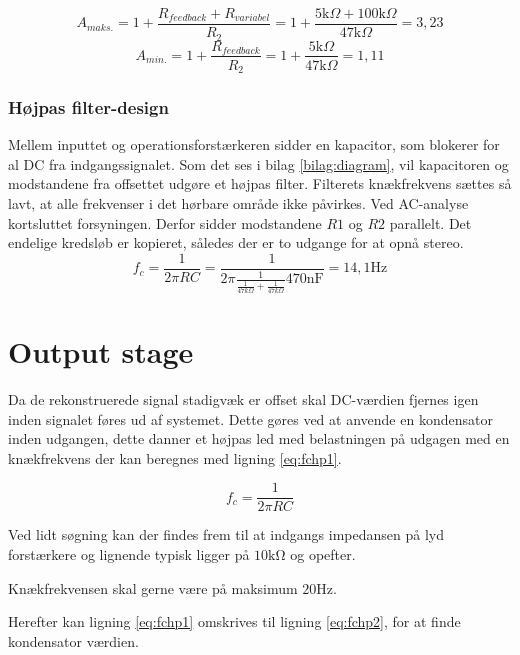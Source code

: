 \begin{equation}
\label{eq:Aminfors}
A_{maks.} = 1 + \frac{R_{feedback} + R_{variabel}}{R_2} = 1 + \frac{5\text{k} \Omega + 100\text{k} \Omega}{47\text{k} \Omega} = 3,23
\end{equation}
\begin{equation}
\label{Amaksfors}
A_{min.} = 1 + \frac{R_{feedback}}{R_2} = 1 + \frac{5\text{k} \Omega}{47\text{k} \Omega} = 1,11
\end{equation}

\subsubsection{Højpas filter-design}
Mellem inputtet og operationsforstærkeren sidder en kapacitor, som blokerer for al DC fra indgangssignalet. 
Som det ses i bilag \ref{bilag:diagram}, vil kapacitoren og modstandene fra offsettet udgøre et højpas filter. 
Filterets knækfrekvens sættes så lavt, at alle frekvenser i det hørbare område ikke påvirkes. 
Ved AC-analyse kortsluttet forsyningen. Derfor sidder modstandene $R1$ og $R2$ parallelt.
Det endelige kredsløb er kopieret, således der er to udgange for at opnå stereo. 
\begin{equation}
f_c = \frac{1}{2\pi R C} = \frac{1}{2 \pi \frac{1}{\frac{1}{47k \Omega}+\frac{1}{47k \Omega}}  470\text{nF}} = 14,1\text{Hz}
\end{equation}

\section{Output stage}

Da de rekonstruerede signal stadigvæk er offset skal DC-værdien fjernes igen inden signalet føres ud af systemet.
Dette gøres ved at anvende en kondensator inden udgangen, dette danner et højpas led med belastningen på udgagen med en knækfrekvens der kan beregnes med ligning \ref{eq:fchp1}.

\begin{equation}
	f_c = \frac{1}{2\pi RC}
\label{eq:fchp1}
\end{equation}

Ved lidt søgning kan der findes frem til at indgangs impedansen på lyd forstærkere og lignende typisk ligger på $10\si{\kilo\ohm}$ og opefter.

Knækfrekvensen skal gerne være på maksimum $20\si{\hertz}$.

Herefter kan ligning \ref{eq:fchp1} omskrives til ligning \ref{eq:fchp2}, for at finde kondensator værdien.

